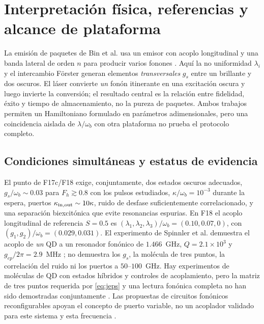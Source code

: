 \documentclass[11pt,a4paper]{article}
\newcommand{\wb}{\omega_b}
\begin{document}
\section{Interpretación física, referencias y alcance de plataforma}\label{sec:alcance}
La emisión de paquetes de Bin et al. usa un emisor con acoplo longitudinal
y una banda lateral de orden $n$ para producir varios fonones
\cite{bin2020}. Aquí la no uniformidad $\lambda_i$ y el intercambio
Förster generan elementos \emph{transversales} $g_s$ entre un brillante y
dos oscuros. El láser convierte \emph{un} fonón itinerante en una
excitación oscura y luego invierte la conversión; el resultado central es
la relación entre fidelidad, éxito y tiempo de almacenamiento, no la
pureza de paquetes. Ambos trabajos permiten un Hamiltoniano formulado
en parámetros adimensionales, pero una coincidencia aislada de
$\lambda/\wb$ con otra plataforma no prueba el protocolo completo.

\subsection{Condiciones simultáneas y estatus de evidencia}
El punto de F17c/F18 exige, conjuntamente, dos estados oscuros adecuados,
$g_s/\wb\sim0.03$ para $F_h\gtrsim0.8$ con los pulsos estudiados,
$\kappa/\wb=10^{-3}$ durante la espera, puertos $\kappa_{\rm in,out}\sim
10\kappa$, ruido de desfase suficientemente correlacionado, y una
separación biexcitónica que evite resonancias espurias. En F18 el
acoplo longitudinal de referencia $S=0.5$ es
$(\lambda_1,\lambda_2,\lambda_3)/\wb=(0.10,0.07,0)$, con
$(g_1,g_2)/\wb=(0.029,0.031)$. El experimento de Spinnler et al.
demuestra el acoplo de \emph{un} QD a un resonador fonónico de
$1.466$~GHz, $Q=2.1\times10^3$ y $g_{ep}/2\pi=2.9$~MHz
\cite{spinnler2024}; no demuestra los $g_s$, la molécula de tres puntos,
la correlación del ruido ni los puertos a $50$--$100$~GHz.
Hay experimentos de moléculas de QD con estados híbridos y controles
de acoplamiento, pero la matriz de tres puntos requerida por
\eqref{eq:jeps} y una lectura fonónica completa no han sido demostradas
conjuntamente \cite{gerardot2005}. Las propuestas de circuitos fonónicos
reconfigurables apoyan el concepto de puerto variable, no un acoplador
validado para este sistema y esta frecuencia \cite{taylor2022phononmemory}.
\end{document}
